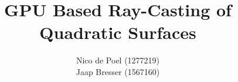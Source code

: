 \title{GPU Based Ray-Casting of Quadratic Surfaces}
\author{Nico de Poel (1277219)\\Jaap Bresser (1567160)}
